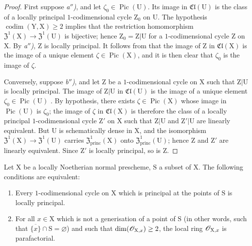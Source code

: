 \begin{proof}
First suppose \emph{a$''$)}, and let $\zeta_0\in\operatorname{Pic}(\mathrm{U})$. Its image in $\mathfrak{Cl}(\mathrm{U})$  is the class of a locally principal $1$-codimensional cycle $\mathrm{Z}_0$ on $\mathrm{U}$. The hypothesis $\operatorname{codim}(\mathrm{Y},\mathrm{X})\geq 2$ implies that the restriction homomorphism $\mathfrak{Z}^1(\mathrm{X})\to\mathfrak{Z}^1(\mathrm{U})$ is bijective; hence $\mathrm{Z}_0=\mathrm{Z}|\mathrm{U}$ for a $1$-codimensional cycle $\mathrm{Z}$ on $\mathrm{X}$. By \emph{a$''$)}, $\mathrm{Z}$ is locally principal. It follows from  that the image of $\mathrm{Z}$ in $\mathfrak{Cl}(\mathrm{X})$ is the image of a unique element $\zeta\in\operatorname{Pic}(\mathrm{X})$, and it is then clear that $\zeta_0$ is the image of $\zeta$.

Conversely, suppose \emph{b$''$)}, and let $\mathrm{Z}$ be a $1$-codimensional cycle on $\mathrm{X}$ such that $\mathrm{Z}|\mathrm{U}$ is locally principal. The image of $\mathrm{Z}|\mathrm{U}$ in $\mathfrak{Cl}(\mathrm{U})$ is the image of a unique element $\zeta_0\in\operatorname{Pic}(\mathrm{U})$ . By hypothesis, there exists $\zeta\in\operatorname{Pic}(\mathrm{X})$ whose image in $\operatorname{Pic}(\mathrm{U})$ is $\zeta_0$; the image of $\zeta$ in $\mathfrak{Cl}(\mathrm{X})$ is therefore the class of a locally principal $1$-codimensional cycle $\mathrm{Z}'$ on $\mathrm{X}$ such that $\mathrm{Z}|\mathrm{U}$ and $\mathrm{Z}'|\mathrm{U}$ are linearly equivalent. But $\mathrm{U}$ is schematically dense in $\mathrm{X}$, and the isomorphism $\mathfrak{Z}^1(\mathrm{X})\to\mathfrak{Z}^1(\mathrm{U})$ carries $\mathfrak{Z}_{\mathrm{princ}}^1(\mathrm{X})$ onto $\mathfrak{Z}_{\mathrm{princ}}^1(\mathrm{U})$; hence $\mathrm{Z}$ and $\mathrm{Z}'$ are linearly equivalent. Since $\mathrm{Z}'$ is locally principal, so is $\mathrm{Z}$.
\end{proof}

\begin{corollary}[21.13.15]
\label{IV.21.13.15}
Let $\mathrm{X}$ be a locally Noetherian normal prescheme, $\mathrm{S}$ a subset of $\mathrm{X}$.
The following conditions are equivalent:
\begin{enumerate}[label=\emph{\alph*)}]
  \item Every $1$-codimensional cycle on $\mathrm{X}$ which is principal at the points of $\mathrm{S}$ is locally principal.
  \item For all $x\in\mathrm{X}$ which is not a generisation of a point of $\mathrm{S}$ \textup{(}in other words, such that $\overline{\{x\}}\cap\mathrm{S}=\varnothing$\textup{)} and such that $\dim(\mathscr{O}_{\mathrm{X},x})\geq 2$, the local ring $\mathscr{O}_{\mathrm{X},x}$ is parafactorial.
\end{enumerate}
\end{corollary}


